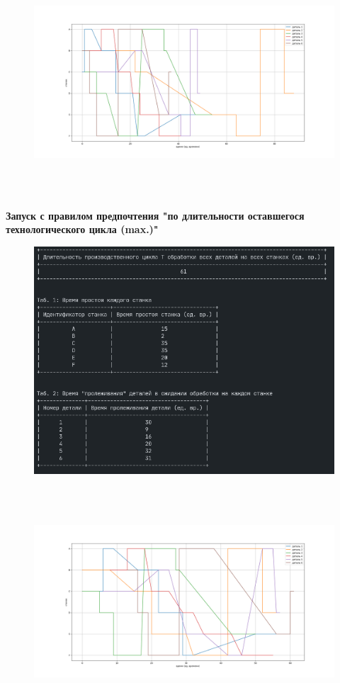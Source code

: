 \documentclass[a4paper,12pt]{article}
\begin{document}
\begin{flushleft}
\begin{enumerate}
\begin{figure}[H]
    \includegraphics[width=18.25cm,height=8.5cm]{test_1.png}
    \centering
    \caption{}
    \label{fig:diagram_1}
  \end{figure}
  \textbf{Запуск с правилом предпочтения "по длительности оставшегося технологического цикла (max.)"}
  \begin{figure}[H]
    \includegraphics[width=12.25cm,height=8.5cm]{test_2_data.png}
    \centering
    \caption{}
    \label{fig:data_2}
  \end{figure}
  \begin{figure}[H]
    \includegraphics[width=18.25cm,height=8.5cm]{test_2.png}

\end{figure}
\end{enumerate}
\end{flushleft}
\end{document}
